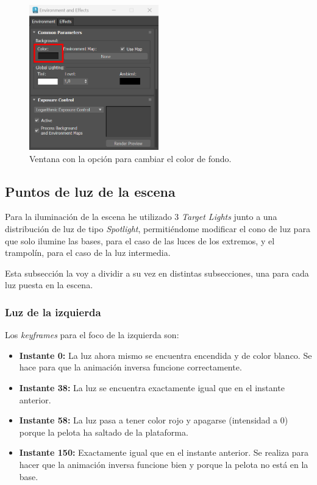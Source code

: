 \begin{figure}[H]
    \centering
    \includegraphics[width=0.5\textwidth]{imagenes/misc/bg-color2.png}
    \caption{Ventana con la opción para cambiar el color de fondo.}
 \end{figure}

\subsection{Puntos de luz de la escena}
Para la iluminación de la escena he utilizado 3 \textit{Target Lights} junto a una distribución de luz de tipo \textit{Spotlight}, permitiéndome modificar el cono de luz para que solo ilumine las bases, para el caso de las luces de los extremos, y el trampolín, para el caso de la luz intermedia.

\bigskip

Esta subsección la voy a dividir a su vez en distintas subsecciones, una para cada luz puesta en la escena.

\subsubsection{Luz de la izquierda}

Los \textit{keyframes} para el foco de la izquierda son:

\begin{itemize}
    \item \textbf{Instante 0: }La luz ahora mismo se encuentra encendida y de color blanco. Se hace para que la animación inversa funcione correctamente.
    \item \textbf{Instante 38: }La luz se encuentra exactamente igual que en el instante anterior.
    \item \textbf{Instante 58: }La luz pasa a tener color rojo y apagarse (intensidad a 0) porque la pelota ha saltado de la plataforma.
    \item \textbf{Instante 150: }Exactamente igual que en el instante anterior. Se realiza para hacer que la animación inversa funcione bien y porque la pelota no está en la base.
\end{itemize}

